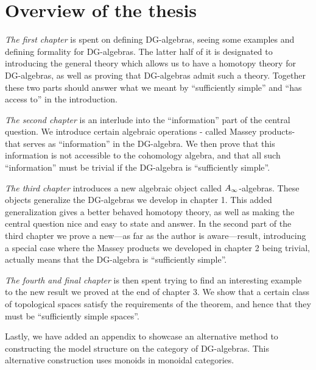

\section{Overview of the thesis}

\textit{The first chapter} is spent on defining DG-algebras, seeing some examples and  defining formality for DG-algebras. The latter half of it is designated to introducing the general theory which allows us to have a homotopy theory for DG-algebras, as well as proving that DG-algebras admit such a theory. Together these two parts should answer what we meant by ``sufficiently simple'' and ``has access to'' in the introduction.

\textit{The second chapter} is an interlude into the ``information'' part of the central question. We introduce certain algebraic operations - called Massey products- that serves as ``information'' in the DG-algebra. We then prove that this information is not accessible to the cohomology algebra, and that all such ``information'' must be trivial if the DG-algebra is ``sufficiently simple''. 

\textit{The third chapter} introduces a new algebraic object called $A_{\infty}$-algebras. These objects generalize the DG-algebras we develop in chapter 1. This added generalization gives a better behaved homotopy theory, as well as making the central question nice and easy to state and answer. In the second part of the third chapter we prove a new---as far as the author is aware---result, introducing a special case where the Massey products we developed in chapter 2 being trivial, actually means that the DG-algebra is ``sufficiently simple''. 

\textit{The fourth and final chapter} is then spent trying to find an interesting example to the new result we proved at the end of chapter 3. We show that a certain class of topological spaces satisfy the requirements of the theorem, and hence that they must be ``sufficiently simple spaces''. 

Lastly, we have added an appendix to showcase an alternative method to constructing the model structure on the category of DG-algebras. This alternative construction uses monoids in monoidal categories. 



